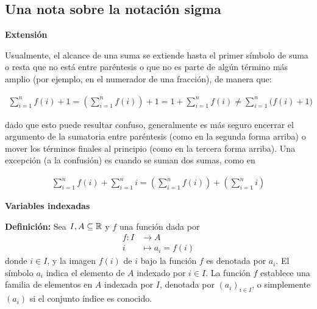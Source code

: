 
\subsection*{Una nota sobre la notación sigma}




\textbf{Extensión}

Usualmente, el alcance de una suma se extiende hasta el primer símbolo de suma o resta que no está entre paréntesis o que no es parte de algún término más amplio (por ejemplo, en el numerador de una fracción), de manera que:

\begin{align*}
  \sum_{i=1}^{n} f(i) + 1 = \left(\sum_{i=1}^{n}f(i)\right) + 1 = 1 + \sum_{i=1}^{n} f(i) \neq \sum_{i=1}^{n} \bigl(f(i)+1\bigr)
\end{align*}

dado que esto puede resultar confuso, generalmente es más seguro encerrar el argumento de la sumatoria entre paréntesis (como en la segunda forma arriba) o mover los términos finales al principio (como en la tercera forma arriba). Una excepción (a la confusión) es cuando se suman dos sumas, como en

\begin{align*}
  \sum_{i=1}^{n} f(i) + \sum_{i=1}^{n} i = \left(\sum_{i=1}^{n}f(i)\right) + \left(\sum_{i=1}^{n}i\right)
\end{align*}

\textbf{Variables indexadas}

\textbf{Definición:} Sea $I, A\subseteq \mathbb{R}$ y $f$ una función dada por
\begin{align*}
  f : I &\to A\\
  i &\mapsto a_i = f(i) 
\end{align*}
donde $i\in I$, y la imagen $f(i)$ de $i$ bajo la función $f$ es denotada por $a_i$. El símbolo $a_i$ indica el elemento de $A$ indexado por $i\in I$. La función $f$ establece una familia de elementos en $A$ indexada por $I$, denotada por $(a_i)_{i\in I}$, o simplemente $(a_i)$ si el conjunto índice es conocido.


